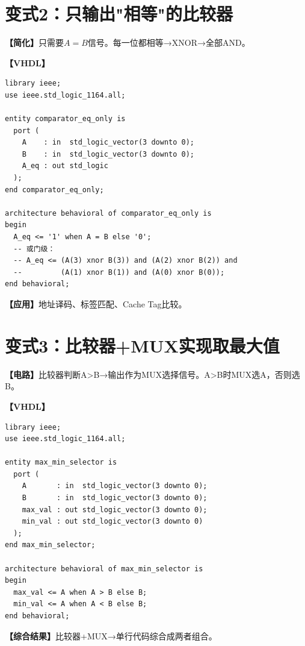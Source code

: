 \section{变式2：只输出"相等"的比较器}

\begin{detailbox}[完整教学]
\textbf{【简化】}只需要$A=B$信号。每一位都相等→XNOR→全部AND。

\textbf{【VHDL】}
\begin{lstlisting}[caption={相等比较器完整实现}]
library ieee;
use ieee.std_logic_1164.all;

entity comparator_eq_only is
  port (
    A    : in  std_logic_vector(3 downto 0);
    B    : in  std_logic_vector(3 downto 0);
    A_eq : out std_logic
  );
end comparator_eq_only;

architecture behavioral of comparator_eq_only is
begin
  A_eq <= '1' when A = B else '0';
  -- 或门级：
  -- A_eq <= (A(3) xnor B(3)) and (A(2) xnor B(2)) and
  --         (A(1) xnor B(1)) and (A(0) xnor B(0));
end behavioral;
\end{lstlisting}

\textbf{【应用】}地址译码、标签匹配、Cache Tag比较。
\end{detailbox}


\section{变式3：比较器+MUX实现取最大值}

\begin{detailbox}[完整教学]
\textbf{【电路】}比较器判断A>B→输出作为MUX选择信号。A>B时MUX选A，否则选B。

\textbf{【VHDL】}
\begin{lstlisting}[caption={最大值/最小值选择器}]
library ieee;
use ieee.std_logic_1164.all;

entity max_min_selector is
  port (
    A       : in  std_logic_vector(3 downto 0);
    B       : in  std_logic_vector(3 downto 0);
    max_val : out std_logic_vector(3 downto 0);
    min_val : out std_logic_vector(3 downto 0)
  );
end max_min_selector;

architecture behavioral of max_min_selector is
begin
  max_val <= A when A > B else B;
  min_val <= A when A < B else B;
end behavioral;
\end{lstlisting}

\textbf{【综合结果】}比较器+MUX→单行代码综合成两者组合。
\end{detailbox}


